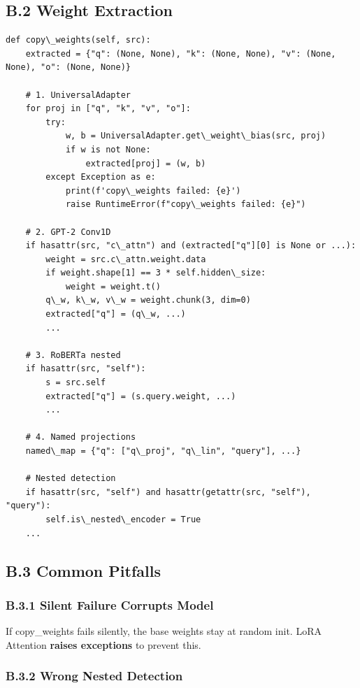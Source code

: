 \subsection{B.2 Weight Extraction}

\begin{lstlisting}
def copy\_weights(self, src):
    extracted = {"q": (None, None), "k": (None, None), "v": (None, None), "o": (None, None)}
    
    # 1. UniversalAdapter
    for proj in ["q", "k", "v", "o"]:
        try:
            w, b = UniversalAdapter.get\_weight\_bias(src, proj)
            if w is not None:
                extracted[proj] = (w, b)
        except Exception as e:
            print(f'copy\_weights failed: {e}')
            raise RuntimeError(f"copy\_weights failed: {e}")
    
    # 2. GPT-2 Conv1D
    if hasattr(src, "c\_attn") and (extracted["q"][0] is None or ...):
        weight = src.c\_attn.weight.data
        if weight.shape[1] == 3 * self.hidden\_size:
            weight = weight.t()
        q\_w, k\_w, v\_w = weight.chunk(3, dim=0)
        extracted["q"] = (q\_w, ...)
        ...
    
    # 3. RoBERTa nested
    if hasattr(src, "self"):
        s = src.self
        extracted["q"] = (s.query.weight, ...)
        ...
    
    # 4. Named projections
    named\_map = {"q": ["q\_proj", "q\_lin", "query"], ...}
    
    # Nested detection
    if hasattr(src, "self") and hasattr(getattr(src, "self"), "query"):
        self.is\_nested\_encoder = True
    ...
\end{lstlisting}

\subsection{B.3 Common Pitfalls}

\subsubsection{B.3.1 Silent Failure Corrupts Model}

If copy\_weights fails silently, the base weights stay at random init. 
LoRA Attention \textbf{raises exceptions} to prevent this.

\subsubsection{B.3.2 Wrong Nested Detection}


